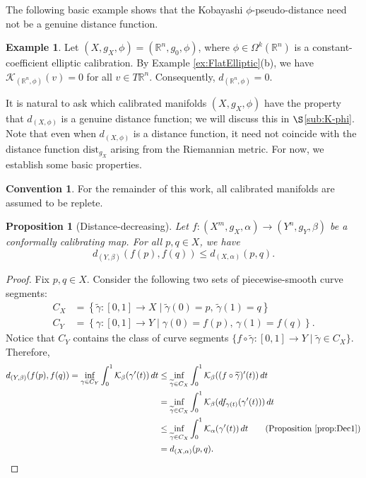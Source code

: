 \documentclass[11pt]{article}
\newcommand{\R}{\mathbb{R}}
\newtheorem{prop}[thm]{Proposition}
\theoremstyle{definition}
\newtheorem{example}[thm]{Example}
\newtheorem{convention}[thm]{Convention}
\numberwithin{equation}{section}
\begin{document}
\indent The following basic example shows that the Kobayashi $\phi$-pseudo-distance need not be a genuine distance function.

\begin{example} \label{ex:Flat-Dist-Degen} Let $(X, g_X, \phi) = (\R^n, g_0, \phi)$, where $\phi \in \Omega^k(\R^n)$ is a constant-coefficient elliptic calibration.  By Example \ref{ex:FlatElliptic}(b), we have $\mathcal{K}_{(\R^n, \phi)}(v) = 0$ for all $v \in T\R^n$.  Consequently, $d_{(\R^n, \phi)} = 0$.
\end{example}

\indent It is natural to ask which calibrated manifolds $(X, g_X, \phi)$ have the property that $d_{(X,\phi)}$ is a genuine distance function; we will discuss this in $\S$\ref{sub:K-phi}.  Note that even when $d_{(X,\phi)}$ is a distance function, it need not coincide with the distance function $\mathrm{dist}_{g_X}$ arising from the Riemannian metric.  For now, we establish some basic properties.

\begin{convention} For the remainder of this work, all calibrated manifolds are assumed to be replete.
\end{convention}

\begin{prop}[Distance-decreasing] \label{Distance-Decreasing-Main} Let $f \colon (X^m, g_X, \alpha) \to (Y^n, g_Y, \beta)$ be a conformally calibrating map.  For all $p,q \in X$, we have
$$d_{(Y,\beta)}(f(p), f(q)) \leq d_{(X,\alpha)}(p,q).$$
\end{prop}

\begin{proof} Fix $p,q \in X$.  Consider the following two sets of piecewise-smooth curve segments:
\begin{align*}
C_X & = \left\{ \widetilde{\gamma} \colon [0,1] \to X \mid \widetilde{\gamma}(0) = p,\, \widetilde{\gamma}(1) = q \right\} \\
C_Y & = \left\{ \gamma \colon [0,1] \to Y \mid \gamma(0) = f(p),\, \gamma(1) = f(q) \right\}\!.
\end{align*}
Notice that $C_Y$ contains the class of curve segments $\{f \circ \widetilde{\gamma} \colon [0,1] \to Y \mid \widetilde{\gamma} \in C_X\}$.  Therefore,
\begin{align*}
d_{(Y,\beta)}(f(p), f(q)) = \inf_{\gamma \in C_Y}  \int_0^1 \mathcal{K}_\beta(\gamma'(t))\,dt  & \leq \inf_{\widetilde{\gamma} \in C_X} \int_0^1 \mathcal{K}_\beta( (f \circ \widetilde{\gamma})'(t) )\,dt  \\
 & = \inf_{\widetilde{\gamma} \in C_X} \int_0^1 \mathcal{K}_\beta( df_{\gamma(t)}(\gamma'(t)) ) \,dt \\
 & \leq \inf_{\widetilde{\gamma} \in C_X} \int_0^1 \mathcal{K}_\alpha( \gamma'(t) )\,dt \tag{Proposition \ref{prop:Dec1}} \\
 & = d_{(X,\alpha)}(p,q).
 \end{align*}
\end{proof}
\end{document}

